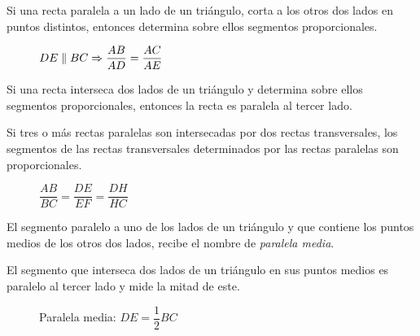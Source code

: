
\begin{theorem}
    Si una recta paralela a un lado de un triángulo, corta a los otros dos lados en puntos distintos, entonces determina sobre ellos segmentos proporcionales.
    
    \begin{figure}[!h]
        \centering
        
        \caption{$DE \parallel BC \Rightarrow \dfrac{AB}{AD} = \dfrac{AC}{AE}$}
        \label{fig:parlela-triangular}
    \end{figure}
\end{theorem}

\begin{theorem}
    Si una recta interseca dos lados de un triángulo y determina sobre ellos segmentos proporcionales, entonces la recta es paralela al tercer lado.    
\end{theorem}

\begin{theorem}
    Si tres o más rectas paralelas son intersecadas por dos rectas transversales, los segmentos de las rectas transversales determinados por las rectas paralelas son proporcionales.

    \begin{figure}[!h]
        \centering
        
        \caption{$\dfrac{AB}{BC} = \dfrac{DE}{EF} = \dfrac{DH}{HC}$}
        \label{fig:teorema-tales}
    \end{figure}    
\end{theorem}

\clearpage

\begin{definition}
    El segmento paralelo a uno de los lados de un triángulo y que contiene los puntos medios de los otros dos lados, recibe el nombre de \textit{paralela media}.
\end{definition}

\begin{theorem}
    El segmento que interseca dos lados de un triángulo en sus puntos medios es paralelo al tercer lado y mide la mitad de este.
\end{theorem}

\begin{figure}[!h]
    \centering
    
    \caption{Paralela media: $DE = \dfrac{1}{2}BC$}
    \label{fig:paralela-media}
\end{figure}    


